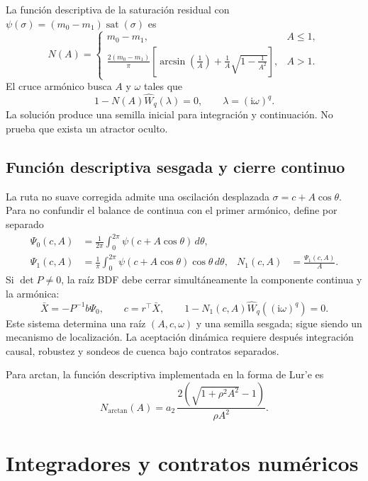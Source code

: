 \documentclass[11pt]{article}
\newcommand{\ii}{\mathrm{i}}
\begin{document}
La función descriptiva de la saturación residual con \(\psi(\sigma)=(m_0-m_1)\operatorname{sat}(\sigma)\) es
\begin{equation}
N(A)=
\begin{cases}
m_0-m_1, & A\le 1,\\[4pt]
\displaystyle
\frac{2(m_0-m_1)}{\pi}
\left[
\arcsin\left(\frac{1}{A}\right)
+\frac{1}{A}\sqrt{1-\frac{1}{A^2}}
\right], & A>1.
\end{cases}
\label{eq:df_nonsmooth}
\end{equation}
El cruce armónico busca \(A\) y \(\omega\) tales que
\[
1-N(A)\widehat W_q\!\left(\lambda\right)=0, \qquad \lambda={\left(\ii\omega\right)}^q.
\]
La solución produce una semilla inicial para integración y continuación. No
prueba que exista un atractor oculto.

\subsection{Función descriptiva sesgada y cierre continuo}

La ruta no suave corregida admite una oscilación desplazada
\(\sigma=c+A\cos\theta\). Para no confundir el balance de continua con el
primer armónico, define por separado
\begin{align}
\Psi_0(c,A)
  &=\frac{1}{2\pi}\int_0^{2\pi}
    \psi(c+A\cos\theta)\,d\theta,\\
\Psi_1(c,A)
  &=\frac{1}{\pi}\int_0^{2\pi}
    \psi(c+A\cos\theta)\cos\theta\,d\theta,
&
N_1(c,A)&=\frac{\Psi_1(c,A)}{A}.
\label{eq:biased_df}
\end{align}
Si \(\det P\neq0\), la raíz BDF debe cerrar simultáneamente la componente
continua y la armónica:
\begin{equation}
\bar X=-P^{-1}b\Psi_0,\qquad
c=r^\top\bar X,\qquad
1-N_1(c,A)\widehat W_q\!\left({(\ii\omega)}^q\right)=0.
\label{eq:biased_dc_harmonic_closure}
\end{equation}
Este sistema determina una raíz \((A,c,\omega)\) y una semilla sesgada; sigue
siendo un mecanismo de localización. La aceptación dinámica requiere después
integración causal, robustez y sondeos de cuenca bajo contratos separados.

Para arctan, la función descriptiva implementada en la forma de Lur'e es
\[
N_{\arctan}(A)=
a_2\,\frac{2\left(\sqrt{1+\rho^2 A^2}-1\right)}{\rho A^2}.
\]
\section{Integradores y contratos numéricos}
\end{document}
